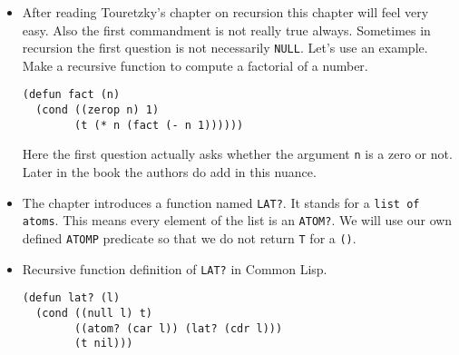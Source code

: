 \documentclass[11pt]{article}
\begin{document}
\vspace{1em}
\begin{itemize}
\item After reading Touretzky's chapter on recursion this chapter will feel very easy. Also the first commandment is not
really true always. Sometimes in recursion the first question is not necessarily \texttt{NULL}. Let's use an example. Make
a recursive  function to compute a factorial of a number.
\begin{verbatim}
(defun fact (n)
  (cond ((zerop n) 1)
        (t (* n (fact (- n 1))))))

\end{verbatim}
Here the first question actually asks whether the argument \texttt{n} is a zero or not. Later in the book the authors do
add in this nuance.
\item The chapter introduces a function named \texttt{LAT?}. It stands for a \texttt{list of atoms}. This means every element of the
list is an \texttt{ATOM?}. We will use our own defined \texttt{ATOMP} predicate so that we do not return \texttt{T} for a \texttt{()}.
\item Recursive function definition of \texttt{LAT?} in Common Lisp.
\begin{verbatim}
(defun lat? (l)
  (cond ((null l) t)
        ((atom? (car l)) (lat? (cdr l)))
        (t nil)))


\end{verbatim}
\end{itemize}
\end{document}
